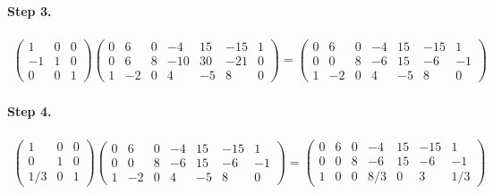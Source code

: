 \documentclass[11pt]{article}
\begin{document}
\paragraph{Step 3.}
\begin{eqnarray*}
\begin{pmatrix}
	1 & 0 & 0 \\
	-1 & 1 & 0 \\
	0 & 0 & 1
\end{pmatrix}
\left(\begin{array}{cccccc|c}  
	0 & 6 & 0 & -4 & 15 & -15 & 1\\
    0 & 6 & 8 & -10 & 30 & -21 & 0\\
    1 & -2 & 0 & 4 & -5 & 8 & 0
\end{array}\right)
=
\left(\begin{array}{cccccc|c}  
	0 & 6 & 0 & -4 & 15 & -15 & 1\\
    0 & 0 & 8 & -6 & 15 & -6 & -1\\
    1 & -2 & 0 & 4 & -5 & 8 & 0
\end{array}\right)
\end{eqnarray*}

\paragraph{Step 4.}
\begin{eqnarray*}
\begin{pmatrix}
	1 & 0 & 0 \\
	0 & 1 & 0 \\
	1/3 & 0 & 1
\end{pmatrix}
\left(\begin{array}{cccccc|c}  
	0 & 6 & 0 & -4 & 15 & -15 & 1\\
    0 & 0 & 8 & -6 & 15 & -6 & -1\\
    1 & -2 & 0 & 4 & -5 & 8 & 0
\end{array}\right)
=
\left(\begin{array}{cccccc|c}  
	0 & 6 & 0 & -4 & 15 & -15 & 1\\
    0 & 0 & 8 & -6 & 15 & -6 & -1\\
    1 & 0 & 0 & 8/3 & 0 & 3 & 1/3
\end{array}\right)
\end{eqnarray*}
\end{document}

